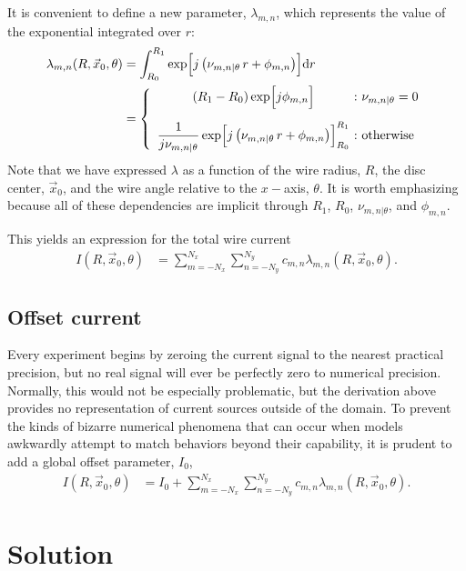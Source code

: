 \documentclass{article}
\def\d{\mathrm{d}}
\def\x{\vec{x}}
\def\nuth{\nu_{m,n|\theta}}
\def\pmn{\phi_{m,n}}
\begin{document}
It is convenient to define a new parameter, $\lambda_{m,n}$, which represents the value of the exponential integrated over $r$:
\begin{align}
\lambda_{m,n}(R,\x_0,\theta) &= \int_{R_0}^{R_1} \exp\Bigl[ j \left(\nuth\,r + \pmn \right)\Bigr] \d r \nonumber\\
 &= \left\{\begin{array}{c@{\ :\ }l}
 \displaystyle (R_1 - R_0) \exp\Bigl[j \pmn \Bigr] & \nuth = 0  \vspace{1.0em} \\
\displaystyle \frac{1}{j \nuth}\exp\Bigl[j \left(\nuth\,r + \pmn \right)\Bigr]^{R_1}_{R_0} & \mathrm{otherwise}
\end{array}
\right.
\end{align}
Note that we have expressed $\lambda$ as a function of the wire radius, $R$, the disc center, $\x_0$, and the wire angle relative to the $x-$axis, $\theta$.  It is worth emphasizing because all of these dependencies are implicit through $R_1$, $R_0$, $\nu_{m,n|\theta}$, and $\phi_{m,n}$.

This yields an expression for the total wire current
\begin{align}
I(R,\x_0,\theta) &= \sum_{m=-N_x}^{N_x} \sum_{n=-N_y}^{N_y} c_{m,n} \lambda_{m,n}(R,\x_0,\theta).
\end{align}

\subsection{Offset current}

Every experiment begins by zeroing the current signal to the nearest practical precision, but no real signal will ever be perfectly zero to numerical precision.  Normally, this would not be especially problematic, but the derivation above provides no representation of current sources outside of the domain.  To prevent the kinds of bizarre numerical phenomena that can occur when models awkwardly attempt to match behaviors beyond their capability, it is prudent to add a global offset parameter, $I_0$,  
\begin{align}
I(R,\x_0,\theta) &= I_0 + \sum_{m=-N_x}^{N_x} \sum_{n=-N_y}^{N_y} c_{m,n} \lambda_{m,n}(R,\x_0,\theta)\label{eqn:I}.
\end{align}


\section{Solution}
\end{document}
